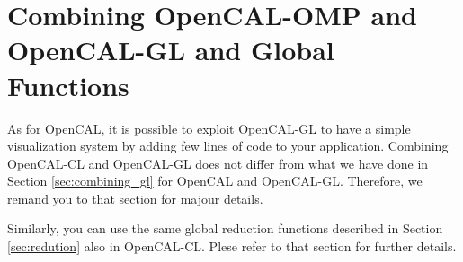 



\section{Combining OpenCAL-OMP and OpenCAL-GL and  Global Functions}

As for OpenCAL, it is possible to exploit OpenCAL-GL to have a simple
visualization system by adding few lines of code to your
application. Combining OpenCAL-CL and OpenCAL-GL does not differ from
what we have done in Section \ref{sec:combining_gl} for OpenCAL and
OpenCAL-GL. Therefore, we remand you to that section for majour
details.

Similarly, you can use the same global reduction functions
described in Section \ref{sec:redution} also in OpenCAL-CL.  Plese
refer to that section for further details.
